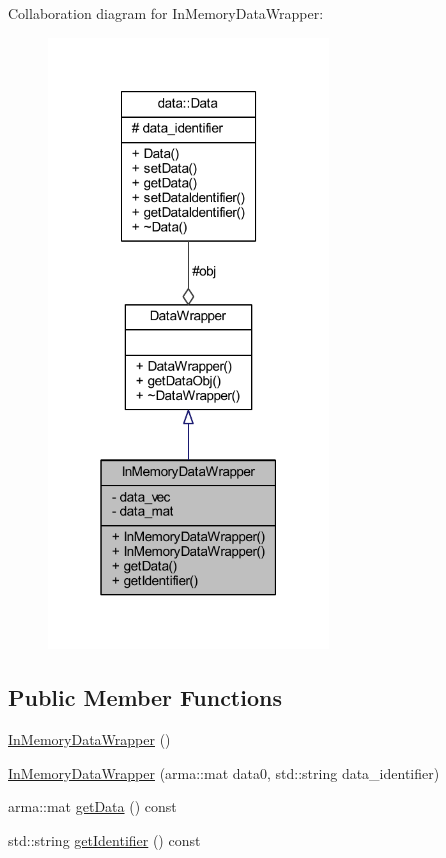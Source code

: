 Collaboration diagram for In\+Memory\+Data\+Wrapper\+:\nopagebreak
\begin{figure}[H]
\begin{center}
\leavevmode
\includegraphics[width=211pt]{class_in_memory_data_wrapper__coll__graph}
\end{center}
\end{figure}
\subsection*{Public Member Functions}
\begin{DoxyCompactItemize}
\item 
\mbox{\hyperlink{class_in_memory_data_wrapper_a091dd35c773aed960bc9ea9e95f7ae5b}{In\+Memory\+Data\+Wrapper}} ()
\item 
\mbox{\hyperlink{class_in_memory_data_wrapper_a0b3a3299fa46c88dc807e858c2f67a1f}{In\+Memory\+Data\+Wrapper}} (arma\+::mat data0, std\+::string data\+\_\+identifier)
\item 
arma\+::mat \mbox{\hyperlink{class_in_memory_data_wrapper_a69c754048807d42d8178914e8339a808}{get\+Data}} () const
\item 
std\+::string \mbox{\hyperlink{class_in_memory_data_wrapper_a2a81d397debd1c568f638004090cbdef}{get\+Identifier}} () const
\end{DoxyCompactItemize}
